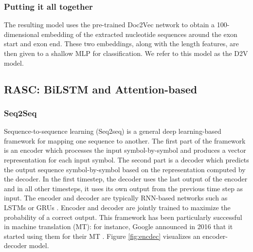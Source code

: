 \subsubsection{Putting it all together} \label{subsubsec:d2vinference}
The resulting model uses the pre-trained Doc2Vec network to obtain a 100-dimensional embedding of the extracted nucleotide sequences around the exon start and exon end. These two embeddings, along with the length features, are then given to a shallow MLP for classification. We refer to this model as the D2V model. 






\subsection{RASC: BiLSTM and Attention-based} \label{subsec:bilstm}
\subsubsection{Seq2Seq} \label{subsubsec:seq2seq}
Sequence-to-sequence learning (Seq2seq) \cite{seq2seq} is a general deep learning-based framework for mapping one sequence to another. The first part of the framework is an encoder which processes the input symbol-by-symbol and produces a vector representation for each input symbol. The second part is a decoder which predicts the output sequence symbol-by-symbol based on the representation computed by the decoder. In the first timestep, the decoder uses the last output of the encoder and in all other timesteps, it uses its own output from the previous time step as input. The encoder and decoder are typically RNN-based networks such as LSTMs \cite{lstm} or GRUs \cite{gru}. Encoder and decoder are jointly trained to maximize the probability of a correct output. This framework has been particularly successful in machine translation (MT): for instance, Google announced in 2016 that it started using them for their MT \cite{googlemt2016}. Figure \ref{fig:encdec} visualizes an encoder-decoder model.


